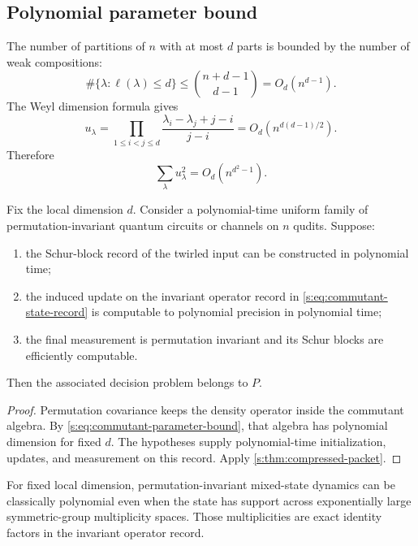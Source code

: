 \subsection{Polynomial parameter bound}
The number of partitions of $n$ with at most $d$ parts is bounded by the number of weak compositions:
\[
\#\{\lambda:\ell(\lambda)\le d\}
\le
\binom{n+d-1}{d-1}
=O_d(n^{d-1}).
\]
The Weyl dimension formula gives
\begin{equation}
u_\lambda
=
\prod_{1\le i<j\le d}
\frac{\lambda_i-\lambda_j+j-i}{j-i}
=O_d\left(n^{d(d-1)/2}\right).
\label{s:eq:weyl-dimension-bound}
\end{equation}
Therefore
\begin{equation}
\sum_\lambda u_\lambda^2
=O_d\left(n^{d^2-1}\right).
\label{s:eq:commutant-parameter-bound}
\end{equation}

\begin{theorem}
\label{s:thm:schur-commutant-collapse}
Fix the local dimension $d$. Consider a polynomial-time uniform family of permutation-invariant quantum circuits or channels on $n$ qudits. Suppose:
\begin{enumerate}
\item the Schur-block record of the twirled input can be constructed in polynomial time;
\item the induced update on the invariant operator record in \cref{s:eq:commutant-state-record} is computable to polynomial precision in polynomial time;
\item the final measurement is permutation invariant and its Schur blocks are efficiently computable.
\end{enumerate}
Then the associated decision problem belongs to $P$.
\end{theorem}

\begin{proof}
Permutation covariance keeps the density operator inside the commutant algebra. By \cref{s:eq:commutant-parameter-bound}, that algebra has polynomial dimension for fixed $d$. The hypotheses supply polynomial-time initialization, updates, and measurement on this record. Apply \cref{s:thm:compressed-packet}.
\end{proof}

\begin{derivedbox}
For fixed local dimension, permutation-invariant mixed-state dynamics can be classically polynomial even when the state has support across exponentially large symmetric-group multiplicity spaces. Those multiplicities are exact identity factors in the invariant operator record.
\end{derivedbox}

